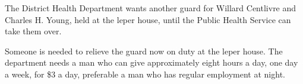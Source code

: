 
The District Health Department wants another guard for Willard
Centlivre and Charles H. Young, held at the leper house, until the
Public Health Service can take them over.

Someone is needed to relieve the guard now on duty at the leper house.
The department needs a man who can give approximately eight hours a
day, one day a week, for \$3 a day, preferable a man who has regular
employment at night.
